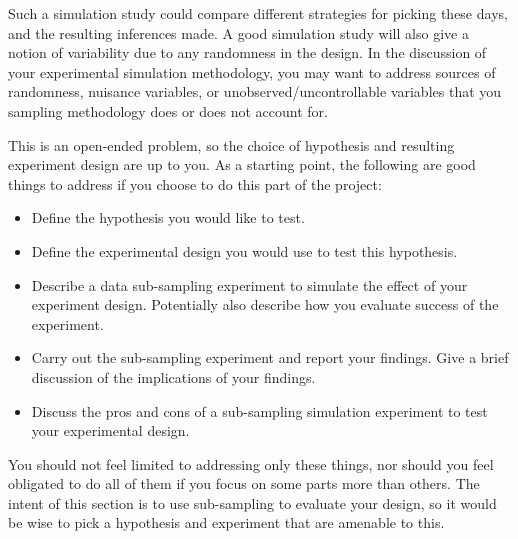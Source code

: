 \documentclass[12pt, answers, addpoints]{exam}
\begin{document}
Such a simulation study could compare different strategies for picking these days, and the resulting inferences made.
A good simulation study will also give a notion of variability due to any randomness in the design. 
In the discussion of your experimental simulation methodology, you may want to address sources of randomness, nuisance variables, or unobserved/uncontrollable variables that you sampling methodology does or does not account for. 

This is an open-ended problem, so the choice of hypothesis and resulting experiment design are up to you. As a starting point, the following are good things to address if you choose to do this part of the project:
\begin{itemize}
    \item Define the hypothesis you would like to test.
    \item Define the experimental design you would use to test this hypothesis.
    \item Describe a data sub-sampling experiment to simulate the effect of your experiment design. Potentially also describe how you evaluate success of the experiment.
    \item Carry out the sub-sampling experiment and report your findings. Give a brief discussion of the implications of your findings.
    \item Discuss the pros and cons of a sub-sampling simulation experiment to test your experimental design. 
\end{itemize}
You should not feel limited to addressing only these things, nor should you feel obligated to do all of them if you focus on some parts more than others. The intent of this section is to use sub-sampling to evaluate your design, so it would be wise to pick a hypothesis and experiment that are amenable to this.

 
 
 
 
 
\end{document}
